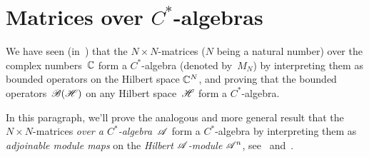 \documentclass[a]{subfiles}
\begin{document}
\section{Matrices over $C^*$-algebras}
\begin{parsec}%
\begin{point}%
We have seen (in~) that the $N\times N$-matrices
($N$ being a natural number) over the complex numbers~$\mathbb{C}$
form a $C^*$-algebra (denoted by~$M_N$) by interpreting
them as bounded operators on the Hilbert space $\mathbb{C}^N$,
and proving
that the bounded operators~$\mathscr{B}(\mathscr{H})$
on any Hilbert space~$\mathscr{H}$ form a $C^*$-algebra.

In this paragraph, we'll prove the analogous
and more general
result that the 
$N\times N$-matrices \emph{over a $C^*$-algebra~$\mathscr{A}$}
form a $C^*$-algebra by interpreting them
as \emph{adjoinable module maps} on
the \emph{Hilbert $\mathscr{A}$-module} $\mathscr{A}^n$,
see~ and~.
\end{point}
\end{parsec}
\end{document}
